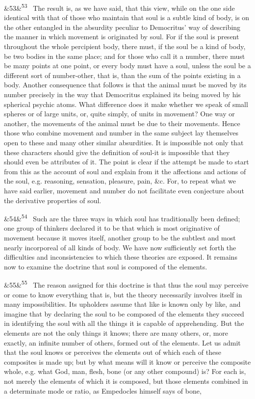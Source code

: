 \documentclass[12pt]{article}
\newcommand{\para}[1][]{\par\noindent\ifx&#1&\else\textsuperscript{\footnotesize #1}~\fi}
\begin{document}
\para[53] The result is, as we have said, that this view, while on the one side identical with that of those who maintain that soul is a subtle kind of body, is on the other entangled in the absurdity peculiar to Democritus' way of describing the manner in which movement is originated by soul. For if the soul is present throughout the whole percipient body, there must, if the soul be a kind of body, be two bodies in the same place; and for those who call it a number, there must be many points at one point, or every body must have a soul, unless the soul be a different sort of number-other, that is, than the sum of the points existing in a body. Another consequence that follows is that the animal must be moved by its number precisely in the way that Democritus explained its being moved by his spherical psychic atoms. What difference does it make whether we speak of small spheres or of large units, or, quite simply, of units in movement? One way or another, the movements of the animal must be due to their movements. Hence those who combine movement and number in the same subject lay themselves open to these and many other similar absurdities. It is impossible not only that these characters should give the definition of soul-it is impossible that they should even be attributes of it. The point is clear if the attempt be made to start from this as the account of soul and explain from it the affections and actions of the soul, e.g. reasoning, sensation, pleasure, pain, \&c. For, to repeat what we have said earlier, movement and number do not facilitate even conjecture about the derivative properties of soul.

\para[54] Such are the three ways in which soul has traditionally been defined; one group of thinkers declared it to be that which is most originative of movement because it moves itself, another group to be the subtlest and most nearly incorporeal of all kinds of body. We have now sufficiently set forth the difficulties and inconsistencies to which these theories are exposed. It remains now to examine the doctrine that soul is composed of the elements.

\para[55] The reason assigned for this doctrine is that thus the soul may perceive or come to know everything that is, but the theory necessarily involves itself in many impossibilities. Its upholders assume that like is known only by like, and imagine that by declaring the soul to be composed of the elements they succeed in identifying the soul with all the things it is capable of apprehending. But the elements are not the only things it knows; there are many others, or, more exactly, an infinite number of others, formed out of the elements. Let us admit that the soul knows or perceives the elements out of which each of these composites is made up; but by what means will it know or perceive the composite whole, e.g. what God, man, flesh, bone (or any other compound) is? For each is, not merely the elements of which it is composed, but those elements combined in a determinate mode or ratio, as Empedocles himself says of bone,
\end{document}
